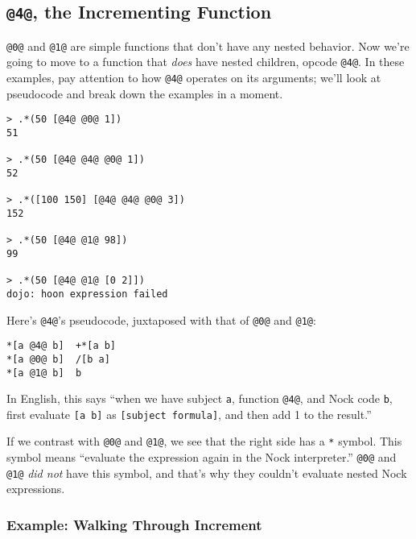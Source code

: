 \documentclass[twoside]{article}
\begin{document}
\subsection{\lstinline[style=inlinecode]{@4@}, the Incrementing Function}
\label{sxn:nock4}

\lstinline[style=inlinecode]{@0@} and \lstinline[style=inlinecode]{@1@} are simple functions that don't have any nested behavior. Now we're going to move to a function that \emph{does} have nested children, opcode \lstinline[style=inlinecode]{@4@}.  In these examples, pay attention to how \lstinline[style=inlinecode]{@4@} operates on its arguments; we'll look at pseudocode and break down the examples in a moment.

\begin{lstlisting}[style=listingblock]
> .*(50 [@4@ @0@ 1])
51

> .*(50 [@4@ @4@ @0@ 1])
52

> .*([100 150] [@4@ @4@ @0@ 3])
152

> .*(50 [@4@ @1@ 98])
99

> .*(50 [@4@ @1@ [0 2]])
dojo: hoon expression failed
\end{lstlisting}

Here's \lstinline[style=inlinecode]{@4@}'s pseudocode, juxtaposed with that of \lstinline[style=inlinecode]{@0@} and \lstinline[style=inlinecode]{@1@}:

\begin{lstlisting}[style=listingcode]
*[a @4@ b]  +*[a b]
*[a @0@ b]  /[b a]
*[a @1@ b]  b
\end{lstlisting}

In English, this says “when we have subject \lstinline[style=inlinecode]{a}, function \lstinline[style=inlinecode]{@4@}, and Nock code \lstinline[style=inlinecode]{b}, first evaluate \lstinline[style=inlinecode]{[a b]} as \lstinline[style=inlinecode]{[subject formula]}, and then add 1 to the result.”

If we contrast with \lstinline[style=inlinecode]{@0@} and \lstinline[style=inlinecode]{@1@}, we see that the right side has a \lstinline[style=inlinecode]{*} symbol. This symbol means “evaluate the expression again in the Nock interpreter.” \lstinline[style=inlinecode]{@0@} and \lstinline[style=inlinecode]{@1@} \emph{did not} have this symbol, and that's why they couldn't evaluate nested Nock expressions.

\subsubsection{Example:  Walking Through Increment}
\end{document}
